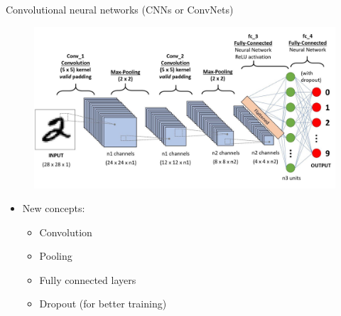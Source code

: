 \documentclass{beamer}
\begin{document}
\begin{frame}{Convolutional neural networks (CNNs or ConvNets)}

\begin{figure}
    \centering
    \includegraphics[scale=0.15]{images/CNN for image.jpeg}
\end{figure}
\begin{itemize}
    \item New concepts:
    \begin{itemize}
        \item Convolution
        \item Pooling
        \item Fully connected layers
        \item Dropout (for better training)
    \end{itemize}
\end{itemize}
    
\end{frame}
\end{document}
